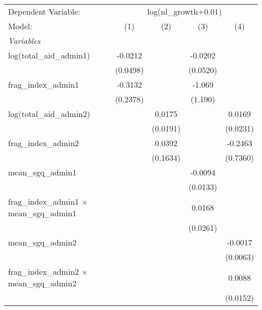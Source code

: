 \begingroup
\centering
\begin{tabular}{lcccc}
   \tabularnewline \midrule \midrule
   Dependent Variable: & \multicolumn{4}{c}{log(nl\_growth+0.01)}\\
   Model:                                              & (1)      & (2)      & (3)      & (4)\\  
   \midrule
   \emph{Variables}\\
   log(total\_aid\_admin1)                             & -0.0212  &          & -0.0202  &   \\   
                                                       & (0.0498) &          & (0.0520) &   \\   
   frag\_index\_admin1                                 & -0.3132  &          & -1.069   &   \\   
                                                       & (0.2378) &          & (1.190)  &   \\   
   log(total\_aid\_admin2)                             &          & 0.0175   &          & 0.0169\\   
                                                       &          & (0.0191) &          & (0.0231)\\   
   frag\_index\_admin2                                 &          & 0.0392   &          & -0.2463\\   
                                                       &          & (0.1634) &          & (0.7360)\\   
   mean\_sgq\_admin1                                   &          &          & -0.0094  &   \\   
                                                       &          &          & (0.0133) &   \\   
   frag\_index\_admin1 $\times$ mean\_sgq\_admin1      &          &          & 0.0168   &   \\   
                                                       &          &          & (0.0261) &   \\   
   mean\_sgq\_admin2                                   &          &          &          & -0.0017\\   
                                                       &          &          &          & (0.0063)\\   
   frag\_index\_admin2 $\times$ mean\_sgq\_admin2      &          &          &          & 0.0088\\   
                                                       &          &          &          & (0.0152)\\   

\end{tabular}
